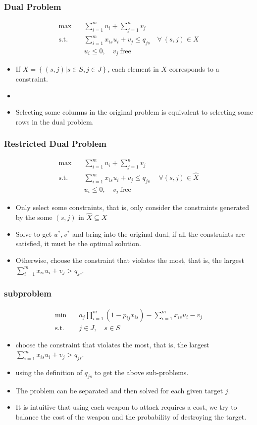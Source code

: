 \documentclass[CJK,10pt]{beamer}
\newcommand{\sumFromTo}[3]{\ensuremath{\sum_{#1}^{#2} #3}}
\newcommand{\optimalProblem}[3]
{\begin{align*}
    #1 \quad &#2 \\
    \mathrm{s. t.}\quad&#3
\end{align*}}
\begin{document}
\begin{frame}
    \frametitle{Dual Problem}
    
    \optimalProblem{\max}{\sumFromTo{i=1}{m}{u_i} + \sumFromTo{j=1}{n}{v_j}\tag{CG-Dual}}{\sumFromTo{i=1}{m}{x_{is}u_i}+ v_j \leq q_{js}\quad \forall ~(s,j) \in X\\ &u_i \leq 0,\quad v_j\ \mathrm{free}}
    \begin{itemize}
        \item If $X = \left\{(s,j) | s\in S , j \in J \right\}$, each element in $X$ corresponds to a constraint.
        \item \item Selecting some columns in the original problem is equivalent to selecting some rows in the dual problem.
    \end{itemize}
\end{frame}

\begin{frame}
    \frametitle{Restricted Dual Problem}
    
    \optimalProblem{\max}{\sumFromTo{i=1}{m}{u_i} + \sumFromTo{j=1}{n}{v_j}\tag{CG-Dual-R}}{\sumFromTo{i=1}{m}{x_{is}u_i}+ v_j \leq q_{js}\quad ~\forall (s,j) \in \hat{X} \\ &u_i \leq 0,\quad v_j\ \mathrm{free}}
    \begin{itemize}
        
        \item Only select some constraints, that is, only consider the constraints generated by the some $(s,j)$ in $\hat{X} \subseteq X$
        \item Solve to get $u^*, v^*$ and bring into the original dual, if all the constraints are satisfied, it must be the optimal solution.
        \item Otherwise, choose the constraint that violates the most, that is, the largest $\sumFromTo{i=1}{m}{x_{is}u_i}+ v_j > q_{js}$.
    \end{itemize}
\end{frame}

\begin{frame}
    \frametitle{subproblem}
    \optimalProblem{\min}{a_j \prod_{i=1}^{m}{(1-p_{ij}x_{is})} -\sumFromTo{i=1}{m}{x_{is}}u_i - v_j}{j \in J,\quad s \in S\tag{CG-sub}}
    \begin{itemize}
        \item choose the constraint that violates the most, that is, the largest $\sumFromTo{i=1}{m}{x_{is}u_i}+ v_j > q_{js}$.
        \item using the definition of $q_{js}$ to get the above sub-problems.
        \item The problem can be separated and then solved for each given target $j$.
        \item It is intuitive that using each weapon to attack requires a cost, we try  to balance the cost of the weapon and the probability of destroying the target.
    \end{itemize}
\end{frame}
\end{document}
